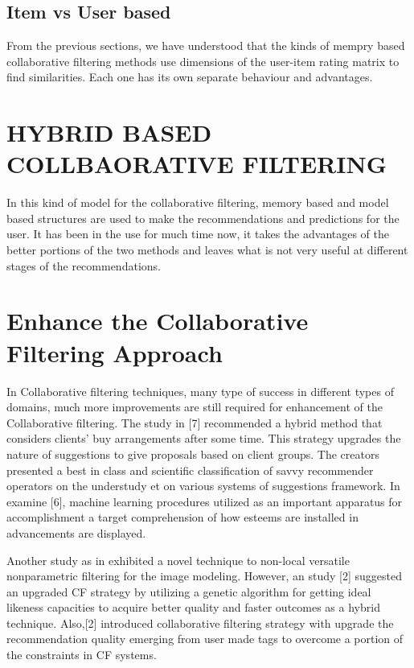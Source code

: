 \documentclass[10pt,conference]{IEEEtran}
\begin{document}
\subsection{Item vs User based}
From the previous sections, we have understood that the kinds of mempry based collaborative filtering methods use dimensions of the user-item rating matrix to find similarities.
Each one has its own separate behaviour and advantages.


\section{HYBRID BASED COLLBAORATIVE FILTERING}
In this kind of model for the collaborative filtering, memory based and model based structures are used to make the recommendations and predictions for the user. It has been in the use for much time now, it takes the advantages of the better portions of the two methods and leaves what is not very useful at different stages of the recommendations.

\section{Enhance the Collaborative Filtering Approach}
In Collaborative filtering techniques, many type of success in different types of domains, much more improvements are still required for enhancement of the Collaborative filtering.
The study in [7] recommended a hybrid method that considers clients' buy arrangements after some time. This strategy upgrades the nature of suggestions to give proposals based on client groups. The creators presented a best in class and scientific classification of savvy recommender operators on the understudy et on various systems of suggestions framework. In examine [6], machine learning procedures utilized as an important apparatus for accomplishment a target comprehension of how esteems are installed in advancements are displayed. 

Another study as in \cite{ekstrand2011collaborative} exhibited a novel technique to non-local versatile nonparametric filtering for the image modeling. However, an study [2] suggested an upgraded CF strategy by utilizing a genetic algorithm for getting ideal likeness capacities to acquire better quality and faster outcomes as a hybrid technique. 
Also,[2] introduced collaborative filtering strategy with upgrade the recommendation quality emerging from user made tags to overcome a portion of the constraints in CF systems.
\end{document}
